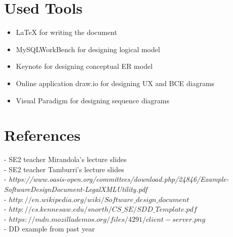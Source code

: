 \documentclass[12pt]{book}
\begin{document}
\chapter{Used Tools}
\begin{itemize}
\item{LaTeX for writing the document}
\item{MySQLWorkBench for designing logical model}
\item{Keynote for designing conceptual ER model}
\item{Online application draw.io for designing UX and BCE diagrams}
\item{Visual Paradigm for designing sequence diagrams}
\end{itemize}
\chapter{References}
- SE2 teacher Mirandola's lecture slides\\
- SE2 teacher Tamburri's lecture slides\\
- \textit{https://www.oasis-open.org/committees/download.php/24846/Example-SoftwareDesignDocument-LegalXMLUtility.pdf}\\
- \textit{$http://en.wikipedia.org/wiki/Software\_design\_document$}\\
- \textit{$http://cs.kennesaw.edu/snorth/CS\_SE/SDD\_Template.pdf$}\\
- \textit{$https://mdn.mozillademos.org/files/4291/client-server.png$}\\
- DD example from past year\\
\end{document}
